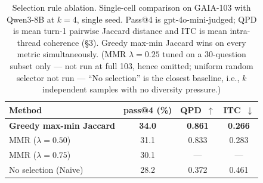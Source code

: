 \begin{table}[t]
\centering
\small
\setlength{\tabcolsep}{6pt}
\renewcommand{\arraystretch}{1.05}
\begin{tabular}{l c c c}
\toprule
\textbf{Method} & pass@4 (\%) & QPD~$\uparrow$ & ITC~$\downarrow$ \\
\midrule
\textbf{Greedy max-min Jaccard} & \textbf{34.0} & \textbf{0.861} & \textbf{0.266} \\
MMR ($\lambda{=}0.50$)          & 31.1 & 0.833 & 0.283 \\
MMR ($\lambda{=}0.75$)          & 30.1 & --- & --- \\
No selection (Naive)            & 28.2 & 0.372 & 0.461 \\
\bottomrule
\end{tabular}
\caption{Selection rule ablation. Single-cell comparison on GAIA-103
with Qwen3-8B at $k{=}4$, single seed. Pass@4 is gpt-4o-mini-judged;
QPD is mean turn-1 pairwise Jaccard distance and ITC is mean
intra-thread coherence (\S3). Greedy max-min Jaccard wins on every
metric simultaneously. (MMR $\lambda{=}0.25$ tuned on a 30-question
subset only --- not run at full 103, hence omitted; uniform random
selector not run --- ``No selection'' is the closest baseline,
i.e., $k$ independent samples with no diversity pressure.)}
\label{tab:app-selection}
\end{table}
